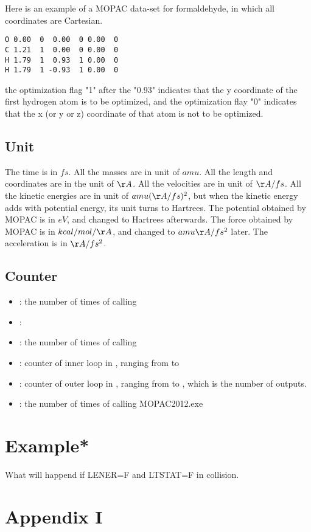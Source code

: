 \documentclass[11pt]{JHEP3}
\begin{document}
Here is an example of a MOPAC data-set for formaldehyde, in which
all coordinates are Cartesian.
\begin{lstlisting}
O 0.00  0  0.00  0 0.00  0
C 1.21  1  0.00  0 0.00  0
H 1.79  1  0.93  1 0.00  0
H 1.79  1 -0.93  1 0.00  0
\end{lstlisting}
the optimization flag "1" after the "0.93" indicates that the y
coordinate of the first hydrogen atom is to be optimized, and the
optimization flay "0" indicates that the x (or y or z) coordinate of
that atom is not to be optimized.


\subsection{Unit}
The time is in $fs$. All the masses are in unit of $amu$. All the
length and coordinates are in the unit of $\AA$. All the velocities
are in unit of $\AA/fs$. All the kinetic energies are in unit of
$amu (\AA/fs)^2$, but when the kinetic energy adds with potential
energy, its unit turns to Hartrees. The potential obtained by MOPAC
is in $eV$, and changed to Hartrees afterwards. The force obtained
by MOPAC is in $kcal/mol/\AA$, and changed to $amu \AA/fs^2$ later.
The acceleration is in $\AA/fs^2$.

\subsection{Counter}
\begin{itemize}
\item {}: the number of times of calling 
\item {}: 
\item {}: the number of times of calling 
\item {}: counter of inner loop in , ranging from  to 
\item {}: counter of outer loop in , ranging from  to , which is the
number of outputs.
\item {}: the number of times of calling
MOPAC2012.exe
\end{itemize}

\section{Example*}
What will happend if LENER=F and LTSTAT=F in collision.



\acknowledgments

\appendix

\section{Appendix I}

\begin{thebibliography}{999}
\end{thebibliography}
\end{document}
